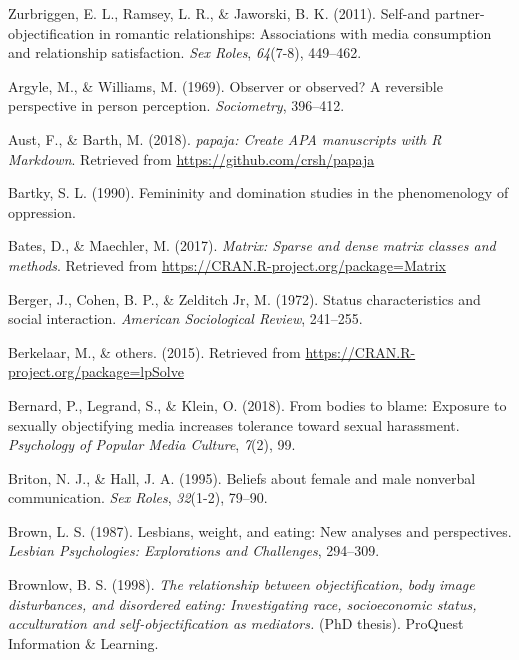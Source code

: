 \documentclass[
  man]{apa6}
\begin{document}
\leavevmode\hypertarget{ref-zurbriggen2011self}{}%
Zurbriggen, E. L., Ramsey, L. R., \& Jaworski, B. K. (2011). Self-and partner-objectification in romantic relationships: Associations with media consumption and relationship satisfaction. \emph{Sex Roles}, \emph{64}(7-8), 449--462.

\leavevmode\hypertarget{ref-argyle1969}{}%
Argyle, M., \& Williams, M. (1969). Observer or observed? A reversible perspective in person perception. \emph{Sociometry}, 396--412.

\leavevmode\hypertarget{ref-R-papaja}{}%
Aust, F., \& Barth, M. (2018). \emph{papaja: Create APA manuscripts with R Markdown}. Retrieved from \url{https://github.com/crsh/papaja}

\leavevmode\hypertarget{ref-Bartky}{}%
Bartky, S. L. (1990). Femininity and domination studies in the phenomenology of oppression.

\leavevmode\hypertarget{ref-R-Matrix}{}%
Bates, D., \& Maechler, M. (2017). \emph{Matrix: Sparse and dense matrix classes and methods}. Retrieved from \url{https://CRAN.R-project.org/package=Matrix}

\leavevmode\hypertarget{ref-berger1972}{}%
Berger, J., Cohen, B. P., \& Zelditch Jr, M. (1972). Status characteristics and social interaction. \emph{American Sociological Review}, 241--255.

\leavevmode\hypertarget{ref-R-lpSolve}{}%
Berkelaar, M., \& others. (2015). Retrieved from \url{https://CRAN.R-project.org/package=lpSolve}

\leavevmode\hypertarget{ref-bernard2018bodies}{}%
Bernard, P., Legrand, S., \& Klein, O. (2018). From bodies to blame: Exposure to sexually objectifying media increases tolerance toward sexual harassment. \emph{Psychology of Popular Media Culture}, \emph{7}(2), 99.

\leavevmode\hypertarget{ref-briton1995}{}%
Briton, N. J., \& Hall, J. A. (1995). Beliefs about female and male nonverbal communication. \emph{Sex Roles}, \emph{32}(1-2), 79--90.

\leavevmode\hypertarget{ref-brown1987lesbians}{}%
Brown, L. S. (1987). Lesbians, weight, and eating: New analyses and perspectives. \emph{Lesbian Psychologies: Explorations and Challenges}, 294--309.

\leavevmode\hypertarget{ref-brownlow1998relationship}{}%
Brownlow, B. S. (1998). \emph{The relationship between objectification, body image disturbances, and disordered eating: Investigating race, socioeconomic status, acculturation and self-objectification as mediators.} (PhD thesis). ProQuest Information \& Learning.
\end{document}
